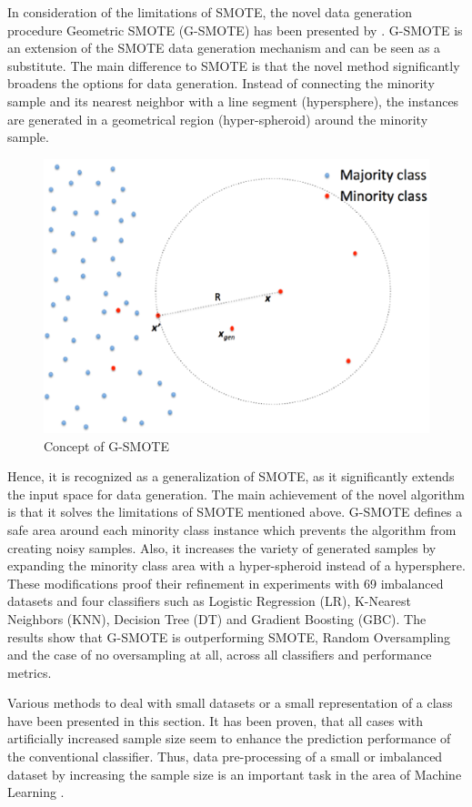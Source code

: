 \documentclass[parskip=full]{scrartcl}
\begin{document}
In consideration of the limitations of SMOTE, the novel data generation
procedure Geometric SMOTE (G-SMOTE) has been presented by \cite{Douzas.2017}.
G-SMOTE is an extension of the SMOTE data generation mechanism and can be seen
as a substitute. The main difference to SMOTE is that the novel method
significantly broadens the options for data generation. Instead of connecting
the minority sample and its nearest neighbor with a line segment (hypersphere),
the instances are generated in a geometrical region (hyper-spheroid) around the
minority sample. 

\begin{figure}[h]
	\centering
	\includegraphics[width=0.5\linewidth]{./resources/gsmote}
	\caption{Concept of G-SMOTE}
	\label{fig:gsmote}
\end{figure}

Hence, it is recognized as a generalization of SMOTE, as it significantly
extends the input space for data generation. The main achievement of the novel
algorithm is that it solves the limitations of SMOTE mentioned above. G-SMOTE
defines a safe area around each minority class instance which prevents the
algorithm from creating noisy samples. Also, it increases the variety of
generated samples by expanding the minority class area with a hyper-spheroid
instead of a hypersphere. These modifications proof their refinement in
experiments with 69 imbalanced datasets and four classifiers such as Logistic
Regression (LR), K-Nearest Neighbors (KNN), Decision Tree (DT) and Gradient
Boosting (GBC). The results show that G-SMOTE is outperforming SMOTE, Random
Oversampling and the case of no oversampling at all, across all classifiers and
performance metrics.  

Various methods to deal with small datasets or a small representation of a class
have been presented in this section. It has been proven, that all cases with
artificially increased sample size seem to enhance the prediction performance of
the conventional classifier. Thus, data pre-processing of a small or imbalanced
dataset by increasing the sample size is an important task in the area of
Machine Learning \cite{Ruparel.2013}.
\end{document}
